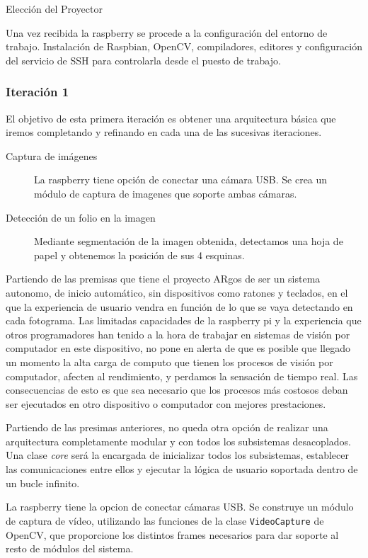 Elección del Proyector

Una vez recibida la raspberry se procede a la configuración del entorno de trabajo. Instalación de Raspbian, OpenCV, compiladores, editores y configuración del servicio de SSH para controlarla desde el puesto de trabajo.

\subsubsection{Iteración 1}
El objetivo de esta primera iteración es obtener una arquitectura básica que iremos completando y refinando en cada una de las sucesivas iteraciones.

\begin{description}
\item [Captura de imágenes] La raspberry tiene opción de conectar una cámara USB. Se crea un módulo de captura de imagenes que soporte ambas cámaras.
\item [Detección de un folio en la imagen] Mediante segmentación de la imagen obtenida, detectamos una hoja de papel y obtenemos la posición de sus 4 esquinas.
\end{description}

Partiendo de las premisas que tiene el proyecto ARgos de ser un sistema autonomo, de inicio automático, sin dispositivos como ratones y teclados, en el que la experiencia de usuario vendra en función de lo que se vaya detectando en cada fotograma. Las limitadas capacidades de la raspberry pi y la experiencia que otros programadores han tenido a la hora de trabajar en sistemas de visión por computador en este dispositivo, no pone en alerta de que es posible que llegado un momento la alta carga de computo que tienen los procesos de visión por computador, afecten al rendimiento, y perdamos la sensación de tiempo real. Las consecuencias de esto es que sea necesario que los procesos más costosos deban ser ejecutados en otro dispositivo o computador con mejores prestaciones.  

Partiendo de las presimas anteriores, no queda otra opción de realizar una arquitectura completamente modular y con todos los subsistemas desacoplados. Una clase \emph{core} será la encargada de inicializar todos los subsistemas, establecer las comunicaciones entre ellos y ejecutar la lógica de usuario soportada dentro de un bucle infinito.

La raspberry tiene la opcion de conectar cámaras USB. Se construye un módulo de captura de vídeo, utilizando las funciones de la clase \texttt{VideoCapture} de OpenCV, que proporcione los distintos frames necesarios para dar soporte al resto de módulos del sistema. 

